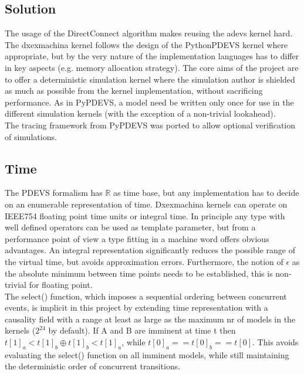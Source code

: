 \subsection{Solution} %
The usage of the DirectConnect\cite{SymbolicFlattening} algorithm makes reusing the adevs kernel hard.
The dxexmachina kernel follows the design of the PythonPDEVS \cite{PythonPDEVS} kernel where appropriate, but by the very nature of the implementation languages has to differ in key aspects (e.g. memory allocation strategy). 
The core aims of the project are to offer a deterministic simulation kernel where the simulation author is shielded as much as possible from the kernel implementation, without sacrificing performance. As in PyPDEVS, a model need be written only once for use in the different simulation kernels (with the exception of a non-trivial lookahead).\\
The tracing framework from PyPDEVS was ported to allow optional verification of simulations. 
\subsection{Time}
The PDEVS formalism has $\mathbb{R}$ as time base, but any implementation has to decide on an enumerable representation of time. Dxexmachina kernels can operate on IEEE754 floating point time units or integral time. In principle any type with well defined operators can be used as template parameter, but from a performance point of view a type fitting in a machine word offers obvious advantages.%
An integral representation significantly reduces the possible range of the virtual time, but avoids approximation errors. Furthermore, the notion of $\epsilon$ as the absolute minimum between time points needs to be established, this is non-trivial for floating point.\\
The select() function, which imposes a sequential ordering between concurrent events, is implicit in this project by extending time representation with a causality field with a range at least as large as the maximum nr of models in the kernels ($2^{24}$ by default). If A and B are imminent at time t then $t[1]_a < t[1]_b \oplus t[1]_b < t[1]_a$, while $t[0]_a == t[0]_b == t[0]$. This avoids evaluating the select() function on all imminent models, while still maintaining the deterministic order of concurrent transitions.
